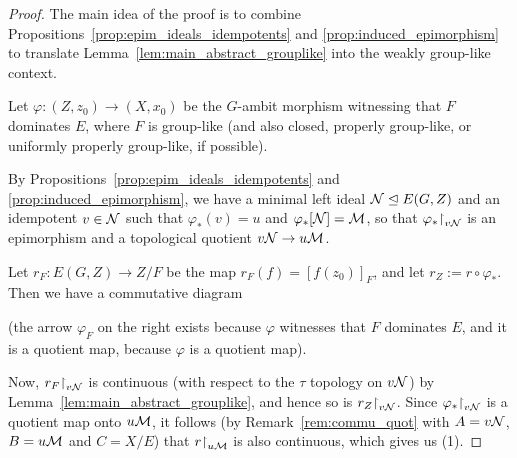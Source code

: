 	\begin{proof}
		The main idea of the proof is to combine Propositions~\ref{prop:epim_ideals_idempotents} and \ref{prop:induced_epimorphism} to translate Lemma~\ref{lem:main_abstract_grouplike} into the weakly group-like context.
		
		Let $\varphi\colon (Z,z_0)\to (X,x_0)$ be the $G$-ambit morphism witnessing that $F$ dominates $E$, where $F$ is group-like (and also closed, properly group-like, or uniformly properly group-like, if possible).
		
		By Propositions~\ref{prop:epim_ideals_idempotents} and \ref{prop:induced_epimorphism}, we have a minimal left ideal ${\mathcal N}\trianglelefteq E(G,Z)$ and an idempotent $v\in {\mathcal N}$ such that $\varphi_*(v)=u$ and $\varphi_*[{\mathcal N}]={\mathcal M}$, so that $\varphi_*\mathord{\upharpoonright}_{v{\mathcal N}}$ is an epimorphism and a topological quotient $v{\mathcal N}\to u{\mathcal M}$.
		
		Let $r_F\colon E(G,Z)\to Z/F$ be the map $r_F(f)=[f(z_0)]_F$, and let $r_Z:= r\circ \varphi_*$. Then we have a commutative diagram
		\begin{center}
		\end{center}
		(the arrow $\varphi_F$ on the right exists because $\varphi$ witnesses that $F$ dominates $E$, and it is a quotient map, because $\varphi$ is a quotient map).
		
		Now, $r_F\mathord{\upharpoonright}_{v{\mathcal N}}$ is continuous (with respect to the $\tau$ topology on $v{\mathcal N}$) by Lemma~\ref{lem:main_abstract_grouplike}, and hence so is $r_Z\mathord{\upharpoonright}_{v{\mathcal N}}$. Since $\varphi_*\mathord{\upharpoonright}_{v{\mathcal N}}$ is a quotient map onto $u{\mathcal M}$, it follows (by Remark~\ref{rem:commu_quot} with $A=v{\mathcal N}$, $B=u{\mathcal M}$ and $C=X/E$) that $r\mathord{\upharpoonright}_{u{\mathcal M}}$ is also continuous, which gives us (1).
		

\end{proof}
